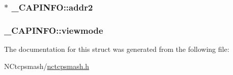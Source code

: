 \hypertarget{struct__CAPINFO_219c7cc447a511ec60e94547e2677f52}{
\subsubsection{$\ast$ {\bf \_\-CAPINFO::addr2}}}
\label{struct__CAPINFO_219c7cc447a511ec60e94547e2677f52}


\hypertarget{struct__CAPINFO_e2469703229ab23ccdc5c54465524492}{
\subsubsection{ {\bf \_\-CAPINFO::viewmode}}}
\label{struct__CAPINFO_e2469703229ab23ccdc5c54465524492}




The documentation for this struct was generated from the following file:\begin{CompactItemize}
\item 
NCtcpsmash/\hyperlink{nctcpsmash_8h}{nctcpsmash.h}\end{CompactItemize}
